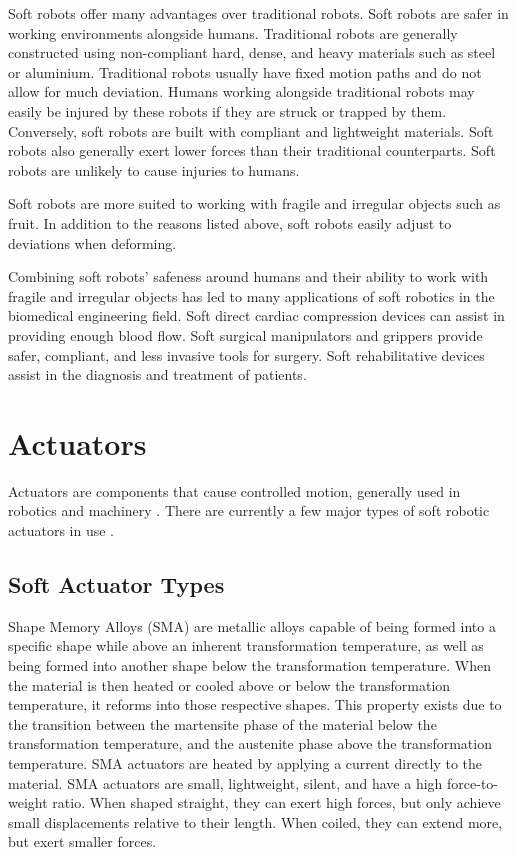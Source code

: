 Soft robots offer many advantages over traditional robots. Soft robots are safer in working environments alongside humans. Traditional robots are generally constructed using non-compliant hard, dense, and heavy materials such as steel or aluminium. Traditional robots usually have fixed motion paths and do not allow for much deviation. Humans working alongside traditional robots may easily be injured by these robots if they are struck or trapped by them. Conversely, soft robots are built with compliant and lightweight materials. Soft robots also generally exert lower forces than their traditional counterparts. Soft robots are unlikely to cause injuries to humans. \citep{Whitesides2018, Martinez2013}

Soft robots are more suited to working with fragile and irregular objects such as fruit. In addition to the reasons listed above, soft robots easily adjust to deviations when deforming.  \citep{Whitesides2018, Martinez2013}

Combining soft robots' safeness around humans and their ability to work with fragile and irregular objects has led to many applications of soft robotics in the biomedical engineering field. Soft direct cardiac compression devices can assist in providing enough blood flow. Soft surgical manipulators and grippers provide safer, compliant, and less invasive tools for surgery. Soft rehabilitative devices assist in the diagnosis and treatment of patients. \citep{Hsiao2019}

\section{Actuators}

Actuators are components that cause controlled motion, generally used in robotics and machinery \citep{Sekhar2012}. There are currently a few major types of soft robotic actuators in use \citep{Boyraz2018}.

\subsection{Soft Actuator Types}

Shape Memory Alloys (SMA) are metallic alloys capable of being formed into a specific shape while above an inherent transformation temperature, as well as being formed into another shape below the transformation temperature. When the material is then heated or cooled above or below the transformation temperature, it reforms into those respective shapes. This property exists due to the transition between the martensite phase of the material below the transformation temperature, and the austenite phase above the transformation temperature. SMA actuators are heated by applying a current directly to the material. SMA actuators are small, lightweight, silent, and have a high force-to-weight ratio. When shaped straight, they can exert high forces, but only achieve small displacements relative to their length. When coiled, they can extend more, but exert smaller forces. \citep{Villoslada2014}

